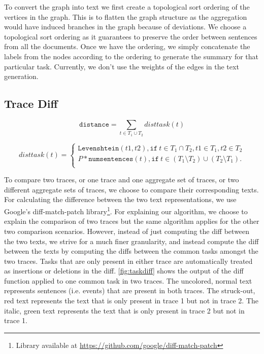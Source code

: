  To convert the graph into text we first create a topological sort ordering of the vertices
in the graph. This is to flatten the graph structure as the aggregation would have induced branches in the graph
because of deviations. We choose a topological sort ordering as it guarantees to preserve the order
between sentences from all the documents. Once we have the ordering, we simply concatenate the labels
from the nodes according to the ordering to generate the summary for that particular task.
Currently, we don't use the weights of the edges in the text generation.

\subsection{Trace Diff}

\begin{figure*}[tbh]
    \begin{equation}\label{eqn:disttrace}
    \texttt{distance} = \sum_{t \in T_1 \cup T_2} disttask(t)
    \end{equation}
    
    \begin{equation}\label{eqn:disttask}
        disttask(t)=
        \begin{cases}
            \texttt{Levenshtein}(t1, t2), \texttt{if}\: t \in T_1 \cap T_2, t1 \in T_1, t2 \in T_2 \\
            P * \texttt{numsentences}(t), \texttt{if}\: t \in (T_1 \setminus T_2) \cup (T_2 \setminus T_1).\\
        \end{cases}
    \end{equation}
    \end{figure*}

To compare two traces, or one trace and one aggregate set of traces, or two different aggregate sets of traces, we choose to compare their corresponding texts. For calculating the difference
between the two text representations, we use Google's diff-match-patch library\footnote{Library available at \url{https://github.com/google/diff-match-patch}}. For explaining our algorithm, we choose to explain the comparison
of two traces but the same algorithm applies for the other two comparison scenarios.
However, instead of just computing the diff between the two texts, we strive for a much finer granularity, and instead
compute the diff between the texts by computing the diffs between the common tasks amongst the two traces.
Tasks that are only present in either trace are automatically treated as insertions or deletions in the diff.
\autoref{fig:taskdiff} shows the output of the diff function applied to one common task in two traces.
The uncolored, normal text represents sentences (i.e. events) that are present in both traces. The struck-out,
red text represents the text that is only present in trace 1 but not in trace 2. The italic, green text represents
the text that is only present in trace 2 but not in trace 1.

